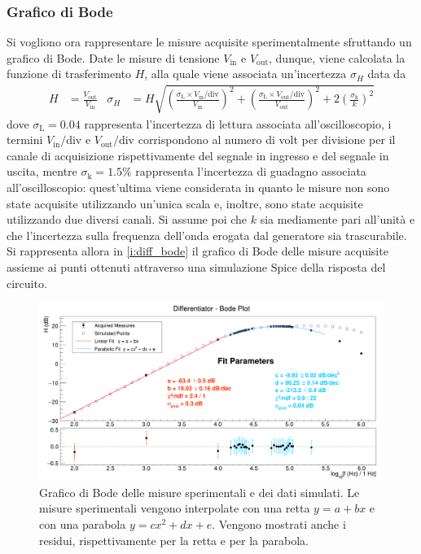 \documentclass[a4paper,11pt]{article} %
\begin{document}
\subsubsection{Grafico di Bode}
Si vogliono ora rappresentare le misure acquisite sperimentalmente sfruttando un grafico di Bode. Date le misure di
tensione $V_{\text{in}}$ e $V_{\text{out}}$, dunque, viene calcolata la funzione di trasferimento $H$, alla quale viene
associata un'incertezza $\sigma_{H}$ data da
\begin{align}\label{e:diff_err}
	H&=\frac{V_{\text{out}}}{V_{\text{in}}} & 
	\sigma_{H}&= H \sqrt{	
						\left(	\frac{	\sigma_{\text{L}}\times V_{\text{in}}/\text{div}	}{	V_{\text{in}}	}	\right)^2	 + 
						\left(	\frac{	\sigma_{\text{L}}\times V_{\text{out}}/\text{div}	}{	V_{\text{out}}	}	\right)^2 +	
						2\left(	\frac{	\sigma_{\text{k}}	}{	k	}	\right)^2 }	
\end{align}
\noindent dove $\sigma_{\text{L}}=0.04$ rappresenta l'incertezza di lettura associata all'oscilloscopio, i termini
$V_{\text{in}}/\text{div}$ e $V_{\text{out}}/\text{div}$ corrispondono al numero di volt per divisione per il canale di
acquisizione rispettivamente del segnale in ingresso e del segnale in uscita, mentre $\sigma_{\text{k}}=1.5\%$
rappresenta l'incertezza di guadagno associata all'oscilloscopio: quest'ultima viene considerata in quanto le misure non
sono state acquisite utilizzando un'unica scala e, inoltre, sono state acquisite utilizzando due diversi canali. Si
assume poi che $k$ sia mediamente pari all'unità e che l'incertezza sulla frequenza dell'onda erogata dal generatore sia
trascurabile. Si rappresenta allora in \autoref{i:diff_bode} il grafico di Bode delle misure acquisite assieme ai punti
ottenuti attraverso una simulazione Spice della risposta del circuito. \newpage
\begin{figure}[H]
	\centering
	\includegraphics[width=\linewidth]{../Plots/Report_Plots/diff_bode.png}
	\caption{\small Grafico di Bode delle misure sperimentali e dei dati simulati. Le misure sperimentali vengono
	interpolate con una retta $y = a + bx$ e con una parabola $y = cx^2+dx+e$. Vengono mostrati anche i residui, 
	rispettivamente per la retta e per la parabola.}
	\label{i:diff_bode}
\end{figure}
\end{document}
